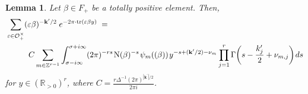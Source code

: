 \documentclass[11pt]{amsart}
\newtheorem{lemma}[theorem]{Lemma}
\theoremstyle{remark}
\newcommand\mbf[1]{\mathbf{#1}}
\newcommand{\inte}{\mathbb{Z}}
\newcommand{\real}{\mathbb{R}}
\newcommand{\eps}{\varepsilon}
\newcommand{\clo}{\mathcal{O}}
\newcommand{\eq}{\;=\;}
\def\thin{{\hskip 1pt}}
\newcommand{\N}{\mathrm{N}}
\newcommand{\tr}{\mathrm{tr}}
\begin{document}
\begin{lemma}
\label{phibeta}
Let $\beta\in F_+$ be a totally positive element. Then,
\begin{equation}
\begin{aligned}
\label{phibetaeqn}
    &\sum_{\eps\in\clo_+^\times}(\eps\beta)^{-\mbf{k}^\prime/2}\;e^{-2\pi\cdot\tr(\eps\beta y)}\eq \\
    &\hspace{1cm}C\sum_{m\in\inte^{r-1}}\int_{\sigma-i\infty}^{\sigma+i\infty}(2\pi)^{-rs}\thin\N(\beta)^{-s}\thin\psi_m((\beta))\thin y^{-s+(\mbf{k}^\prime/2)-\nu_m}\prod_{j=1}^r\Gamma\bigg(s-\frac{k_j^\prime}{2}+\nu_{m,j}\bigg)\thin ds
\end{aligned}
\end{equation}
for $y\in(\real_{>0})^r$, where $C=\frac{r\Delta^{-1}(2\pi)^{|\mbf{k}^\prime|/2}}{2\pi i}$.
\end{lemma}
\end{document}
